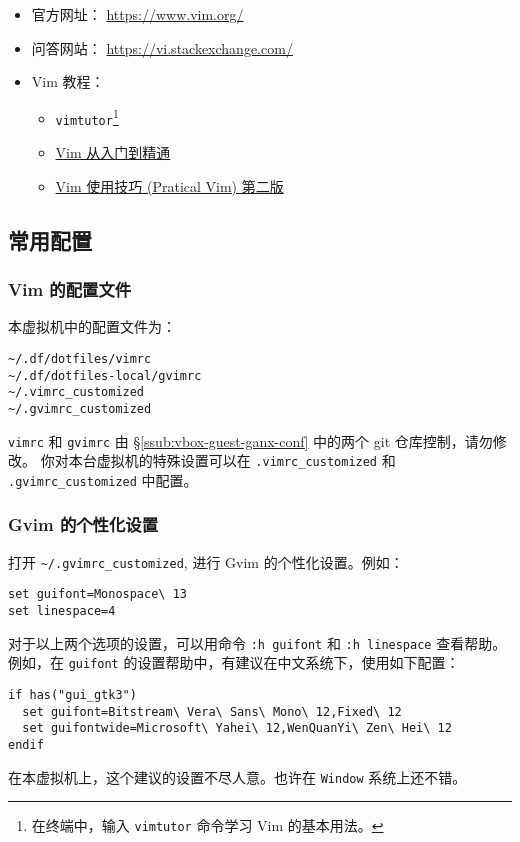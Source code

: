 \documentclass[
    11pt,
    base=hide,
    cite=authoryear,
    device=phone,
    lang=cn,
    mode=simple,
    result=answer,
    toc=onecol,
]{elegantbook_sierxue}
\begin{document}
\begin{itemize}
    \item 官方网址： \href{https://www.vim.org/}{https://www.vim.org/}
    \item 问答网站：
        \href{https://vi.stackexchange.com/}{https://vi.stackexchange.com/}
    \item Vim 教程：
        \begin{itemize}
            \item \lstinline{vimtutor}\footnote{
                在终端中，输入 \lstinline{vimtutor} 命令学习 Vim
                的基本用法。}
            \item \href{https://github.com/wsdjeg/vim-galore-zh_cn}
                {Vim 从入门到精通}
            \item \href{https://item.jd.com/12056490.html}
                {Vim 使用技巧 (Pratical Vim) 第二版}
        \end{itemize}
\end{itemize}

\subsection{常用配置}%
\label{sub:vim-intro}

\subsubsection{Vim 的配置文件}%
\label{ssub:vim-config}

本虚拟机中的配置文件为：
\begin{lstlisting}[style=lst]
~/.df/dotfiles/vimrc
~/.df/dotfiles-local/gvimrc
~/.vimrc_customized
~/.gvimrc_customized
\end{lstlisting}
\lstinline{vimrc} 和 \lstinline{gvimrc} 由
\S\ref{ssub:vbox-guest-ganx-conf} 中的两个 git 仓库控制，请勿修改。
你对本台虚拟机的特殊设置可以在 \lstinline{.vimrc_customized} 和
\lstinline{.gvimrc_customized} 中配置。

\subsubsection{Gvim 的个性化设置}%
\label{ssub:vim-gui-config-customized}

打开 \lstinline{~/.gvimrc_customized}, 进行 Gvim 的个性化设置。例如：
\begin{lstlisting}[style=lst]
set guifont=Monospace\ 13
set linespace=4
\end{lstlisting}
对于以上两个选项的设置，可以用命令 \lstinline{:h guifont} 和
\lstinline{:h linespace} 查看帮助。
例如，在 \lstinline{guifont} 的设置帮助中，有建议在中文系统下，使用如下配置：
\begin{lstlisting}[xleftmargin=.04\textwidth]
if has("gui_gtk3")
  set guifont=Bitstream\ Vera\ Sans\ Mono\ 12,Fixed\ 12
  set guifontwide=Microsoft\ Yahei\ 12,WenQuanYi\ Zen\ Hei\ 12
endif
\end{lstlisting}
\begin{note}\label{note:guifont}
    在本虚拟机上，这个建议的设置不尽人意。也许在 \lstinline{Window}
    系统上还不错。
\end{note}
\end{document}
